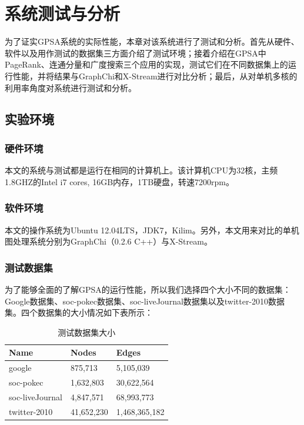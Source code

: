 
\chapter{系统测试与分析}

为了证实GPSA系统的实际性能，本章对该系统进行了测试和分析。首先从硬件、软件以及用作测试的数据集三方面介绍了测试环境；接着介绍在GPSA中PageRank、连通分量和广度搜索三个应用的实现，测试它们在不同数据集上的运行性能，并将结果与GraphChi和X-Stream进行对比分析；最后，从对单机多核的利用率角度对系统进行测试和分析。


\section{实验环境}

\subsection{硬件环境}
本文的系统与测试都是运行在相同的计算机上。该计算机CPU为32核，主频1.8GHZ的Intel i7 cores, 16GB内存，1TB硬盘，转速7200rpm。
\subsection{软件环境}
本文的操作系统为Ubuntu 12.04LTS，JDK7，Kilim。另外，本文用来对比的单机图处理系统分别为GraphChi（0.2.6 C++）与X-Stream。

\subsection{测试数据集}
为了能够全面的了解GPSA的运行性能，所以我们选择四个大小不同的数据集：Google数据集、soc-pokec数据集、soc-liveJournal数据集以及twitter-2010数据集。四个数据集的大小情况如下表所示：
\renewcommand\arraystretch{1.5}%
\begin{table}[!h]
\caption{测试数据集大小}\label{tab:bench}
\vspace{0.5em}
\centering
\begin{tabular}{l*{1}{C{2cm}}*{1}{L{6.2cm}}}
\toprule
Name         & Nodes & Edges\\
\midrule
google      & 875,713  & 5,105,039\\
soc-pokec      & 1,632,803 & 30,622,564\\
soc-liveJournal      & 4,847,571 & 68,993,773\\
twitter-2010      & 41,652,230 & 1,468,365,182\\

\bottomrule
\end{tabular}
\vspace{\baselineskip}
\end{table}
\renewcommand\arraystretch{1}

